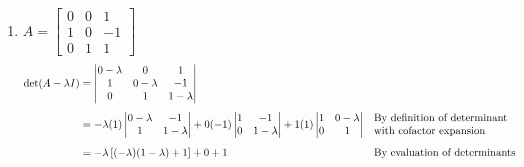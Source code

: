 \documentclass[10pt,letterpaper,final]{report}
\newcommand{\reason}[1]{&& \text{#1}}
\begin{document}
\begin{enumerate}[label=(\alph*)]
  \item $A = \begin{bmatrix}
            0 & 0 & 1  \\
            1 & 0 & -1 \\
            0 & 1 & 1
          \end{bmatrix}$
        \begin{align*}
          \det(A - \lambda I) & = \begin{vmatrix}
                                    0 - \lambda & 0           & 1           \\
                                    1           & 0 - \lambda & -1          \\
                                    0           & 1           & 1 - \lambda
                                  \end{vmatrix}                                                                                                                                  \\[1ex]
                              & = -\lambda(1)\begin{vmatrix}
                                               0 - \lambda & -1          \\
                                               1           & 1 - \lambda
                                             \end{vmatrix} + 0(-1)\begin{vmatrix}
                                                                    1 & -1          \\
                                                                    0 & 1 - \lambda
                                                                  \end{vmatrix} + 1(1)\begin{vmatrix}
                                                                                        1 & 0 - \lambda \\
                                                                                        0 & 1
                                                                                      \end{vmatrix} \reason{\begin{tabular}[c]{@{}l@{}}By definition of determinant \\ with cofactor expansion\end{tabular}} \\[1ex]
                              & = -\lambda\left[(-\lambda)(1 - \lambda) + 1\right] + 0 + 1 \reason{By evaluation of determinants}                                                                            \\[1ex]

\end{align*}
\end{enumerate}
\end{document}

